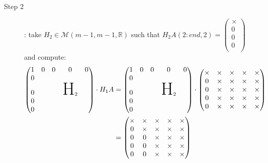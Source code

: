 \documentclass[computationalMathematics.tex]{subfiles}
\begin{document}
\begin{example}
\begin{description}
  \item[{\sc Step 2}]: take $H_{2} \in \mathcal{M}(m-1, m-1, \mathds{R})$ such that $H_{2}A(2:end, 2) = \begin{pmatrix} \times\\ 0\\ 0\\ 0\\ \end{pmatrix}$ and compute:
    \begin{equation}
      \begin{aligned}
        \begin{pmatrix}
          1 & 0 & 0 & 0 & 0\\
          0 & & & &\\
          0 & && \text{\Huge H}_2\\
          0 &&&\\
          0 &&&\\
        \end{pmatrix} \cdot H_1 A
        &= 
        \begin{pmatrix}
          1 & 0 & 0 & 0 & 0\\
          0 & & &\\
          0 && & \text{\Huge H}_2\\
          0 &&& \\
          0 &&&\\
        \end{pmatrix} \cdot  \begin{pmatrix}
          \times & \times & \times & \times & \times\\
          0 & \times & \times & \times & \times\\
          0 & \times & \times & \times & \times\\
          0 & \times & \times & \times & \times\\
          0 & \times & \times & \times & \times\\
        \end{pmatrix}\\
        &= \begin{pmatrix}
          \times & \times & \times & \times & \times\\
          0 & \times & \times & \times & \times\\
          0 & 0 & \times & \times & \times\\
          0 & 0 & \times & \times & \times\\
          0 & 0 & \times & \times & \times\\
        \end{pmatrix}
      \end{aligned}
    \end{equation}
    

\end{description}
\end{example}
\end{document}
